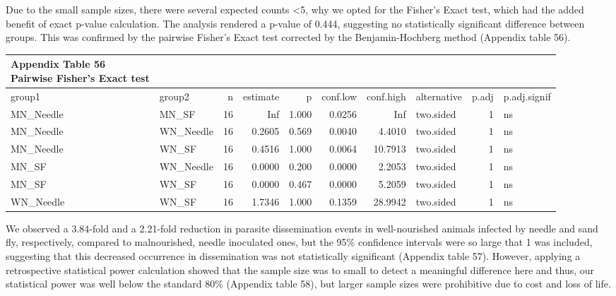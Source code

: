 \documentclass[
  12pt,
  letterpaper,
]{article}
\begin{document}
Due to the small sample sizes, there were several expected counts \textless5, why we opted for the Fisher's Exact test, which had the added benefit of exact p-value calculation. The analysis rendered a p-value of 0.444, suggesting no statistically significant difference between groups. This was confirmed by the pairwise Fisher's Exact test corrected by the Benjamin-Hochberg method (Appendix table 56).

\begingroup
\fontsize{12.0pt}{14.4pt}\selectfont
\begin{longtable}{llrrrrrlrl}
\caption*{
{\large \textbf{Appendix Table 56}} \\ 
{\small \textbf{Pairwise Fisher's Exact test}}
} \\ 
\toprule
{group1} & {group2} & {n} & {estimate} & {p} & {conf.low} & {conf.high} & {alternative} & {p.adj} & {p.adj.signif} \\ 
\midrule\addlinespace[2.5pt]
MN\_Needle & MN\_SF & 16 & Inf & 1.000 & 0.0256 & Inf & two.sided & 1 & ns \\ 
MN\_Needle & WN\_Needle & 16 & 0.2605 & 0.569 & 0.0040 & 4.4010 & two.sided & 1 & ns \\ 
MN\_Needle & WN\_SF & 16 & 0.4516 & 1.000 & 0.0064 & 10.7913 & two.sided & 1 & ns \\ 
MN\_SF & WN\_Needle & 16 & 0.0000 & 0.200 & 0.0000 & 2.2053 & two.sided & 1 & ns \\ 
MN\_SF & WN\_SF & 16 & 0.0000 & 0.467 & 0.0000 & 5.2059 & two.sided & 1 & ns \\ 
WN\_Needle & WN\_SF & 16 & 1.7346 & 1.000 & 0.1359 & 28.9942 & two.sided & 1 & ns \\ 
\bottomrule
\end{longtable}
\endgroup

We observed a 3.84-fold and a 2.21-fold reduction in parasite dissemination events in well-nourished animals infected by needle and sand fly, respectively, compared to malnourished, needle inoculated ones, but the 95\% confidence intervals were so large that 1 was included, suggesting that this decreased occurrence in dissemination was not statistically significant (Appendix table 57). However, applying a retrospective statistical power calculation showed that the sample size was to small to detect a meaningful difference here and thus, our statistical power was well below the standard 80\% (Appendix table 58), but larger sample sizes were prohibitive due to cost and loss of life.
\end{document}
